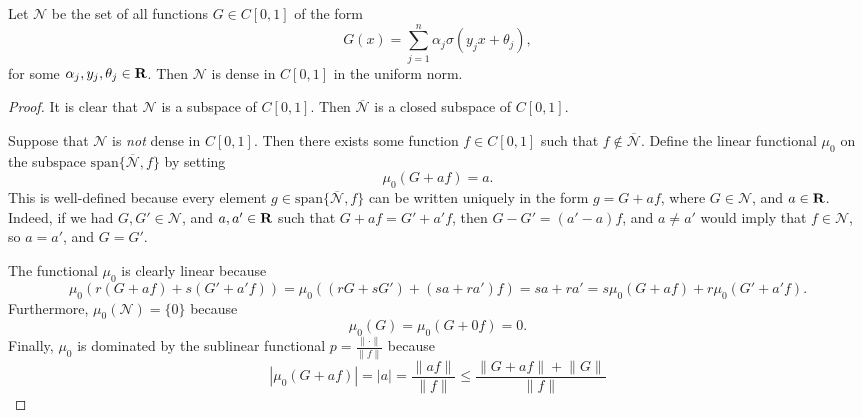 \documentclass{homework}
\begin{document}
	\question
	\newcommand{\neural}{\mathcal{N}}
	Let $\neural$ be the set of all functions $G \in C[0,1]$ of the form
	\begin{equation}
		G(x) = \sum_{j=1}^n \alpha_j\sigma(y_jx + \theta_j),
	\end{equation}
	for some $\alpha_j, y_j, \theta_j \in \textbf{R}$. Then $\neural$ is dense in $C[0,1]$ in the uniform norm.
	\begin{proof}
		It is clear that $\neural$ is a subspace of $C[0,1]$. Then $\overline{\neural}$ is a closed subspace of $C[0,1]$.
		
		Suppose that $\neural$ is \textit{not} dense in $C[0,1]$. Then there exists some function $f \in C[0,1]$ such that $f \notin \overline{\neural}$. Define the linear functional $\mu_0$ on the subspace $\mathrm{span}\{\overline{\neural}, f\}$ by setting
		\begin{equation}
			\mu_0(G + af) = a.
		\end{equation}
		This is well-defined because every element $g \in \mathrm{span}\{\overline{\neural}, f\}$ can be written uniquely in the form $g = G + af$, where $G \in \neural$, and $a \in \textbf{R}$. Indeed, if we had $G,G' \in \neural$, and $a,a' \in \textbf{R}$ such that $G + af = G' + a'f$, then $G-G' = (a'-a)f$, and $a \ne a'$ would imply that $f \in \neural$, so $a = a'$, and $G = G'$.
		
		The functional $\mu_0$ is clearly linear because
		\begin{equation}
			\mu_0(r(G + af) + s(G' + a'f)) = \mu_0((rG + sG') + (sa + ra')f) = sa + ra' = s\mu_0(G+af) + r\mu_0(G'+a'f).
		\end{equation}
		Furthermore, $\mu_0(\neural) = \{0\}$ because
		\begin{equation}
			\mu_0(G) = \mu_0(G + 0f) = 0.
		\end{equation}
		Finally, $\mu_0$ is dominated by the sublinear functional $p =\frac{\lVert \cdot \rVert}{\lVert f \rVert}$ because
		\begin{equation}
			|\mu_0(G + af)| = |a| = \frac{\lVert af\rVert}{\lVert f\rVert} \le \frac{\lVert G+af\rVert + \lVert G \rVert}{\lVert f \rVert}
		\end{equation}
	\end{proof}
	
	\question
	
	
\end{document}
